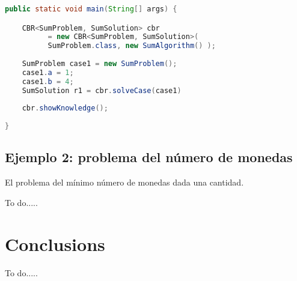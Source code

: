 \documentclass[11pt]{article}
\begin{document}
\begin{lstlisting}[language=Java, caption=Clase SumAlgorithm, label={lst:sum_usage}]
public static void main(String[] args) {

	CBR<SumProblem, SumSolution> cbr 
	      = new CBR<SumProblem, SumSolution>( 
	      SumProblem.class, new SumAlgorithm() );
		
	SumProblem case1 = new SumProblem();
	case1.a = 1;
	case1.b = 4;		
	SumSolution r1 = cbr.solveCase(case1)
		
	cbr.showKnowledge();
	
}
\end{lstlisting}


\subsection{Ejemplo 2: problema del número de monedas}

El problema del mínimo número de monedas dada una cantidad.

To do.....



\section{Conclusions}

To do.....



\end{document}
